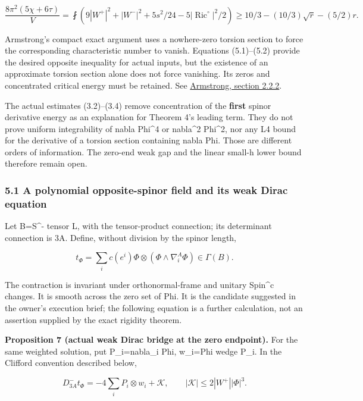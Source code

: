 \documentclass[
  10pt,
]{article}
\begin{document}
\[
 \frac{8\pi^2(5\chi+6\tau)}V
 =\fint(9|W^+|^2+|W^-|^2+5s^2/24-5|\operatorname{Ric}^\circ|^2/2)
 \ge10/3-(10/3)\sqrt r-(5/2)r.                         \tag{5.2}
\]

Armstrong's compact exact argument uses a nowhere-zero torsion section
to force the corresponding characteristic number to vanish. Equations
(5.1)--(5.2) provide the desired opposite inequality for actual inputs,
but the existence of an approximate torsion section alone does not force
vanishing. Its zeros and concentrated critical energy must be retained.
See
\href{https://johnarmstrongmaths.com/publications/resources/thesis.pdf}{Armstrong,
section 2.2.2}.

The actual estimates (3.2)--(3.4) remove concentration of the
\textbf{first} spinor derivative energy as an explanation for Theorem
4's leading term. They do not prove uniform integrability of
\textbar nabla Phi\textbar\^{}4 or \textbar nabla\^{}2 Phi\textbar\^{}2,
nor any L4 bound for the derivative of a torsion section containing
nabla Phi. Those are different orders of information. The zero-end weak
gap and the linear small-h lower bound therefore remain open.

\hypertarget{a-polynomial-opposite-spinor-field-and-its-weak-dirac-equation}{%
\subsubsection{5.1 A polynomial opposite-spinor field and its weak Dirac
equation}\label{a-polynomial-opposite-spinor-field-and-its-weak-dirac-equation}}

Let B=S\^{}- tensor L, with the tensor-product connection; its
determinant connection is 3A. Define, without division by the spinor
length,

\[
 t_\Phi=\sum_i c(e^i)\Phi\otimes(\Phi\wedge\nabla^A_i\Phi)
              \in\Gamma(B).                           \tag{5.3}
\]

The contraction is invariant under orthonormal-frame and unitary
Spin\^{}c changes. It is smooth across the zero set of Phi. It is the
candidate suggested in the owner's execution brief; the following
equation is a further calculation, not an assertion supplied by the
exact rigidity theorem.

\textbf{Proposition 7 (actual weak Dirac bridge at the zero endpoint).}
For the same weighted solution, put P\_i=nabla\_i Phi, w\_i=Phi wedge
P\_i. In the Clifford convention described below,

\[
 D^-_{3A}t_\Phi=-4\sum_i P_i\otimes w_i+\mathcal K,\qquad
 |\mathcal K|\le2|W^+||\Phi|^3.                       \tag{5.4}
\]
\end{document}
